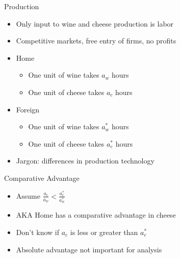 \documentclass[ignorenonframetext,]{beamer}
\begin{document}
\begin{frame}{Production}

    \begin{itemize}
        \item Only input to wine and cheese production is labor
        \item Competitive markets, free entry of firms, no profits
        \item Home
        \begin{itemize}
            \item One unit of wine takes $a_w$ hours
            \item One unit of cheese takes $a_c$ hours
        \end{itemize}
        \item Foreign
        \begin{itemize}
            \item One unit of wine takes $a_w^*$ hours
            \item One unit of cheese takes $a_c^*$ hours
        \end{itemize}
        \item Jargon: differences in production technology
    \end{itemize}

\end{frame}


\begin{frame}{Comparative Advantage}

    \begin{itemize}
        \item Assume $\frac{a_c}{a_w} < \frac{a_c^*}{a_w^*}$
        \item AKA Home has a comparative advantage in cheese 
        \item Don't know if $a_c$ is less or greater than $a_c^*$
        \item Absolute advantage not important for analysis
    \end{itemize}

\end{frame}
\end{document}
